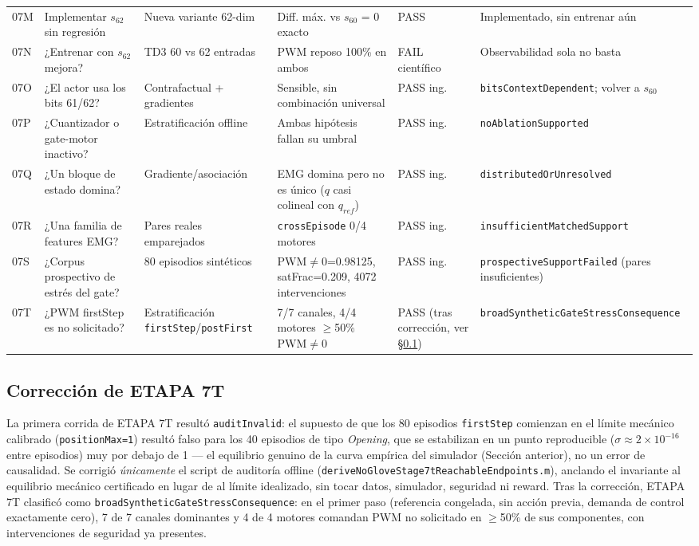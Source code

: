 \documentclass[11pt,a4paper]{article}
\begin{document}
\begin{longtable}{p{1.3cm}p{3.1cm}p{3.3cm}p{3.6cm}p{1.6cm}p{3.4cm}}
07M & Implementar $s_{62}$ sin regresión & Nueva variante 62-dim & Diff. máx. vs $s_{60}$ = 0 exacto & PASS & Implementado, sin entrenar aún \\
07N & ¿Entrenar con $s_{62}$ mejora? & TD3 60 vs 62 entradas & PWM reposo 100\% en ambos & FAIL científico & Observabilidad sola no basta \\
07O & ¿El actor usa los bits 61/62? & Contrafactual + gradientes & Sensible, sin combinación universal & PASS ing. & \texttt{bitsContextDependent}; volver a $s_{60}$ \\
07P & ¿Cuantizador o gate-motor inactivo? & Estratificación offline & Ambas hipótesis fallan su umbral & PASS ing. & \texttt{noAblationSupported} \\
07Q & ¿Un bloque de estado domina? & Gradiente/asociación & EMG domina pero no es único ($q$ casi colineal con $q_{ref}$) & PASS ing. & \texttt{distributedOrUnresolved} \\
07R & ¿Una familia de features EMG? & Pares reales emparejados & \texttt{crossEpisode} 0/4 motores & PASS ing. & \texttt{insufficientMatchedSupport} \\
07S & ¿Corpus prospectivo de estrés del gate? & 80 episodios sintéticos & PWM$\neq$0=0.98125, satFrac=0.209, 4072 intervenciones & PASS ing. & \texttt{prospectiveSupportFailed} (pares insuficientes) \\
07T & ¿PWM firstStep es no solicitado? & Estratificación \texttt{firstStep}/\texttt{postFirst} & 7/7 canales, 4/4 motores $\geq$50\% PWM$\neq$0 & PASS (tras corrección, ver \S\ref{sec:etapa7t}) & \texttt{broadSyntheticGateStressConsequence} \\
\bottomrule
\end{longtable}

\subsection{Corrección de ETAPA 7T}
\label{sec:etapa7t}

La primera corrida de ETAPA 7T resultó \texttt{auditInvalid}: el supuesto de que los 80
episodios \texttt{firstStep} comienzan en el límite mecánico calibrado
(\texttt{positionMax=1}) resultó falso para los 40 episodios de tipo \emph{Opening}, que
se estabilizan en un punto reproducible ($\sigma\approx2\times10^{-16}$ entre episodios)
muy por debajo de 1 --- el equilibrio genuino de la curva empírica del simulador
(Sección anterior), no un error de causalidad. Se corrigió \emph{únicamente} el script
de auditoría offline (\texttt{deriveNoGloveStage7tReachableEndpoints.m}), anclando el
invariante al equilibrio mecánico certificado en lugar de al límite idealizado, sin
tocar datos, simulador, seguridad ni reward. Tras la corrección, ETAPA 7T clasificó
como \texttt{broadSyntheticGateStressConsequence}: en el primer paso (referencia
congelada, sin acción previa, demanda de control exactamente cero), 7 de 7 canales
dominantes y 4 de 4 motores comandan PWM no solicitado en $\geq$50\% de sus componentes,
con intervenciones de seguridad ya presentes.
\end{document}
